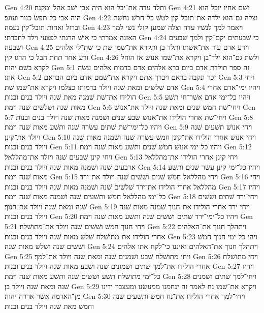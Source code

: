 Gen 4:20  ותלד עדה את־יבל הוא היה אבי ישׁב אהל ומקנה׃
Gen 4:21  ושׁם אחיו יובל הוא היה אבי כל־תפשׂ כנור ועוגב׃
Gen 4:22  וצלה גם־הוא ילדה את־תובל קין לטשׁ כל־חרשׁ נחשׁת וברזל ואחות תובל־קין נעמה׃
Gen 4:23  ויאמר למך לנשׁיו עדה וצלה שׁמען קולי נשׁי למך האזנה אמרתי כי אישׁ הרגתי לפצעי וילד לחברתי׃
Gen 4:24  כי שׁבעתים יקם־קין ולמך שׁבעים ושׁבעה׃
Gen 4:25  וידע אדם עוד את־אשׁתו ותלד בן ותקרא את־שׁמו שׁת כי שׁת־לי אלהים זרע אחר תחת הבל כי הרגו קין׃
Gen 4:26  ולשׁת גם־הוא ילד־בן ויקרא את־שׁמו אנושׁ אז הוחל לקרא בשׁם יהוה׃
Gen 5:1  זה ספר תולדת אדם ביום ברא אלהים אדם בדמות אלהים עשׂה אתו׃
Gen 5:2  זכר ונקבה בראם ויברך אתם ויקרא את־שׁמם אדם ביום הבראם׃
Gen 5:3  ויחי אדם שׁלשׁים ומאת שׁנה ויולד בדמותו כצלמו ויקרא את־שׁמו שׁת׃
Gen 5:4  ויהיו ימי־אדם אחרי הולידו את־שׁת שׁמנה מאת שׁנה ויולד בנים ובנות׃
Gen 5:5  ויהיו כל־ימי אדם אשׁר־חי תשׁע מאות שׁנה ושׁלשׁים שׁנה וימת׃
Gen 5:6  ויחי־שׁת חמשׁ שׁנים ומאת שׁנה ויולד את־אנושׁ׃
Gen 5:7  ויחי־שׁת אחרי הולידו את־אנושׁ שׁבע שׁנים ושׁמנה מאות שׁנה ויולד בנים ובנות׃
Gen 5:8  ויהיו כל־ימי־שׁת שׁתים עשׂרה שׁנה ותשׁע מאות שׁנה וימת׃
Gen 5:9  ויחי אנושׁ תשׁעים שׁנה ויולד את־קינן׃
Gen 5:10  ויחי אנושׁ אחרי הולידו את־קינן חמשׁ עשׂרה שׁנה ושׁמנה מאות שׁנה ויולד בנים ובנות׃
Gen 5:11  ויהיו כל־ימי אנושׁ חמשׁ שׁנים ותשׁע מאות שׁנה וימת׃
Gen 5:12  ויחי קינן שׁבעים שׁנה ויולד את־מהללאל׃
Gen 5:13  ויחי קינן אחרי הולידו את־מהללאל ארבעים שׁנה ושׁמנה מאות שׁנה ויולד בנים ובנות׃
Gen 5:14  ויהיו כל־ימי קינן עשׂר שׁנים ותשׁע מאות שׁנה וימת׃
Gen 5:15  ויחי מהללאל חמשׁ שׁנים ושׁשׁים שׁנה ויולד את־ירד׃
Gen 5:16  ויחי מהללאל אחרי הולידו את־ירד שׁלשׁים שׁנה ושׁמנה מאות שׁנה ויולד בנים ובנות׃
Gen 5:17  ויהיו כל־ימי מהללאל חמשׁ ותשׁעים שׁנה ושׁמנה מאות שׁנה וימת׃
Gen 5:18  ויחי־ירד שׁתים ושׁשׁים שׁנה ומאת שׁנה ויולד את־חנוך׃
Gen 5:19  ויחי־ירד אחרי הולידו את־חנוך שׁמנה מאות שׁנה ויולד בנים ובנות׃
Gen 5:20  ויהיו כל־ימי־ירד שׁתים ושׁשׁים שׁנה ותשׁע מאות שׁנה וימת׃
Gen 5:21  ויחי חנוך חמשׁ ושׁשׁים שׁנה ויולד את־מתושׁלח׃
Gen 5:22  ויתהלך חנוך את־האלהים אחרי הולידו את־מתושׁלח שׁלשׁ מאות שׁנה ויולד בנים ובנות׃
Gen 5:23  ויהי כל־ימי חנוך חמשׁ ושׁשׁים שׁנה ושׁלשׁ מאות שׁנה׃
Gen 5:24  ויתהלך חנוך את־האלהים ואיננו כי־לקח אתו אלהים׃
Gen 5:25  ויחי מתושׁלח שׁבע ושׁמנים שׁנה ומאת שׁנה ויולד את־למך׃
Gen 5:26  ויחי מתושׁלח אחרי הולידו את־למך שׁתים ושׁמונים שׁנה ושׁבע מאות שׁנה ויולד בנים ובנות׃
Gen 5:27  ויהיו כל־ימי מתושׁלח תשׁע ושׁשׁים שׁנה ותשׁע מאות שׁנה וימת׃
Gen 5:28  ויחי־למך שׁתים ושׁמנים שׁנה ומאת שׁנה ויולד בן׃
Gen 5:29  ויקרא את־שׁמו נח לאמר זה ינחמנו ממעשׂנו ומעצבון ידינו מן־האדמה אשׁר אררה יהוה׃
Gen 5:30  ויחי־למך אחרי הולידו את־נח חמשׁ ותשׁעים שׁנה וחמשׁ מאת שׁנה ויולד בנים ובנות׃
